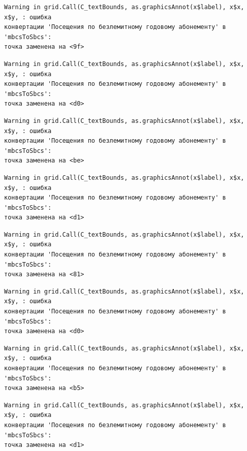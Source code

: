 \documentclass[
  letterpaper,
  DIV=11,
  numbers=noendperiod]{scrreprt}
\begin{document}
\begin{verbatim}
Warning in grid.Call(C_textBounds, as.graphicsAnnot(x$label), x$x, x$y, : ошибка
конвертации 'Посещения по безлемитному годовому абонементу' в 'mbcsToSbcs':
точка заменена на <9f>
\end{verbatim}

\begin{verbatim}
Warning in grid.Call(C_textBounds, as.graphicsAnnot(x$label), x$x, x$y, : ошибка
конвертации 'Посещения по безлемитному годовому абонементу' в 'mbcsToSbcs':
точка заменена на <d0>
\end{verbatim}

\begin{verbatim}
Warning in grid.Call(C_textBounds, as.graphicsAnnot(x$label), x$x, x$y, : ошибка
конвертации 'Посещения по безлемитному годовому абонементу' в 'mbcsToSbcs':
точка заменена на <be>
\end{verbatim}

\begin{verbatim}
Warning in grid.Call(C_textBounds, as.graphicsAnnot(x$label), x$x, x$y, : ошибка
конвертации 'Посещения по безлемитному годовому абонементу' в 'mbcsToSbcs':
точка заменена на <d1>
\end{verbatim}

\begin{verbatim}
Warning in grid.Call(C_textBounds, as.graphicsAnnot(x$label), x$x, x$y, : ошибка
конвертации 'Посещения по безлемитному годовому абонементу' в 'mbcsToSbcs':
точка заменена на <81>
\end{verbatim}

\begin{verbatim}
Warning in grid.Call(C_textBounds, as.graphicsAnnot(x$label), x$x, x$y, : ошибка
конвертации 'Посещения по безлемитному годовому абонементу' в 'mbcsToSbcs':
точка заменена на <d0>
\end{verbatim}

\begin{verbatim}
Warning in grid.Call(C_textBounds, as.graphicsAnnot(x$label), x$x, x$y, : ошибка
конвертации 'Посещения по безлемитному годовому абонементу' в 'mbcsToSbcs':
точка заменена на <b5>
\end{verbatim}

\begin{verbatim}
Warning in grid.Call(C_textBounds, as.graphicsAnnot(x$label), x$x, x$y, : ошибка
конвертации 'Посещения по безлемитному годовому абонементу' в 'mbcsToSbcs':
точка заменена на <d1>
\end{verbatim}
\end{document}
